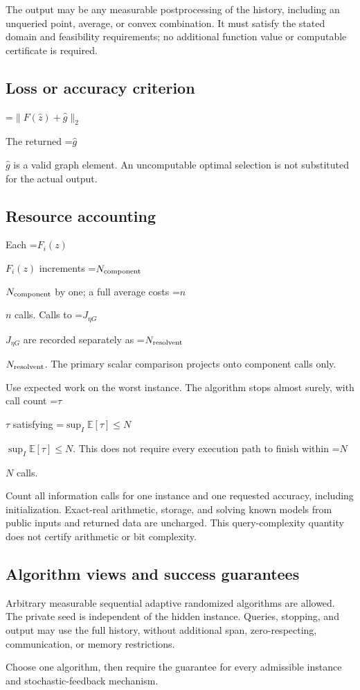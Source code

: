 \documentclass[10pt,a4paper]{article}
\newcommand{\AtlasMath}[1]{\par\begingroup\centering\setbox0=\hbox{$\displaystyle #1$}\ifdim\wd0>1.4\linewidth\typeout{ATLAS WIDE FORMULA: \the\wd0}\fi\ifdim\wd0>\linewidth\resizebox{\linewidth}{!}{\box0}\else\box0\fi\par\endgroup}
\newcommand{\AtlasInlineMath}[1]{\begingroup\setbox0=\hbox{$#1$}\ifdim\wd0>.4\linewidth\endgroup\AtlasMath{#1}\else\endgroup$#1$\fi}
\begin{document}
The output may be any measurable postprocessing of the history, including an unqueried point, average, or convex combination. It must satisfy the stated domain and feasibility requirements; no additional function value or computable certificate is required.

\subsection{Loss or accuracy criterion}

\AtlasMath{\|F(\widehat{z})+\widehat{g}\|_2}


The returned \AtlasInlineMath{\widehat{g}} is a valid graph element. An uncomputable optimal selection is not substituted for the actual output.

\subsection{Resource accounting}
Each \AtlasInlineMath{F_i(z)} increments \AtlasInlineMath{N_{\rm component}} by one; a full average costs \AtlasInlineMath{n} calls. Calls to \AtlasInlineMath{J_{\eta G}} are recorded separately as \AtlasInlineMath{N_{\rm resolvent}}. The primary scalar comparison projects onto component calls only.

Use expected work on the worst instance. The algorithm stops almost surely, with call count \AtlasInlineMath{\tau} satisfying \AtlasInlineMath{\sup_I\mathbb{E}[\tau]\le N}. This does not require every execution path to finish within \AtlasInlineMath{N} calls.

Count all information calls for one instance and one requested accuracy, including initialization. Exact-real arithmetic, storage, and solving known models from public inputs and returned data are uncharged. This query-complexity quantity does not certify arithmetic or bit complexity.

\subsection{Algorithm views and success guarantees}
Arbitrary measurable sequential adaptive randomized algorithms are allowed. The private seed is independent of the hidden instance. Queries, stopping, and output may use the full history, without additional span, zero-respecting, communication, or memory restrictions.

Choose one algorithm, then require the guarantee for every admissible instance and stochastic-feedback mechanism.
\end{document}
